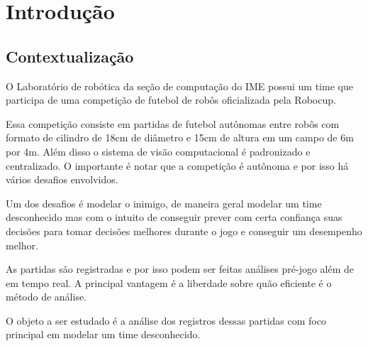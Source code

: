 \chapter{Introdução}

\section{Contextualização}

\par O Laboratório de robótica da seção de computação do IME possui um time que
participa de uma competição de futebol de robôs oficializada pela Robocup.

\par Essa competição consiste em partidas de futebol autônomas entre robôs com formato
de cilindro de 18cm de diâmetro e 15cm de altura em um campo de 6m por 4m. Além disso
o sistema de visão computacional é padronizado e centralizado. O importante é notar
que a competição é autônoma e por isso há vários desafios envolvidos.

\par Um dos desafios é modelar o inimigo, de maneira geral modelar um time desconhecido
mas com o intuito de conseguir prever com certa confiança suas decisões para tomar
decisões melhores durante o jogo e conseguir um desempenho melhor.

\par As partidas são registradas e por isso podem ser feitas análises pré-jogo além
de em tempo real. A principal vantagem é a liberdade sobre quão eficiente é o método
de análise.

\par O objeto a ser estudado é a análise dos registros dessas partidas com foco principal
em modelar um time desconhecido.

